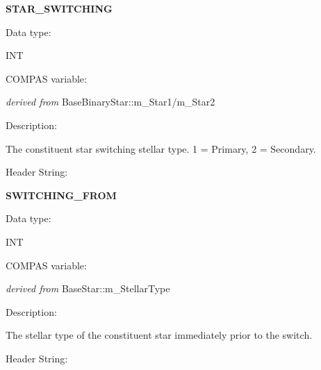 \medskip
\begin{minipage}{\textwidth} %
    \textbf{STAR\_SWITCHING} \\
    \parskip 0pt
    \begin{minipage}[t][][b]{8.25em}Data type:\end{minipage}
    \begin{minipage}[t][][b]{\dimexpr\textwidth-8.75em}INT\end{minipage}\vfill
    \begin{minipage}[t][][b]{8.25em}COMPAS variable:\end{minipage}
    \begin{minipage}[t][][b]{\dimexpr\textwidth-8.75em}\textit{derived from }BaseBinaryStar::m\_Star1/m\_Star2\end{minipage}\vfill
    \begin{minipage}[t][][b]{8.25em}Description:\end{minipage}
    \begin{minipage}[t][][b]{\dimexpr\textwidth-8.75em}\raggedright{The constituent star switching stellar type. 1 = Primary, 2 = Secondary.}\end{minipage}\vfill
    \begin{minipage}[t][][b]{8.25em}Header String:\end{minipage}
    \begin{minipage}[t][][b]{\dimexpr\textwidth-8.75em}\raggedright{}\end{minipage}\vfill
\end{minipage}

\medskip
\begin{minipage}{\textwidth} %
    \textbf{SWITCHING\_FROM} \\
    \parskip 0pt
    \begin{minipage}[t][][b]{8.25em}Data type:\end{minipage}
    \begin{minipage}[t][][b]{\dimexpr\textwidth-8.75em}INT\end{minipage}\vfill
    \begin{minipage}[t][][b]{8.25em}COMPAS variable:\end{minipage}
    \begin{minipage}[t][][b]{\dimexpr\textwidth-8.75em}\textit{derived from }BaseStar::m\_StellarType\end{minipage}\vfill
    \begin{minipage}[t][][b]{8.25em}Description:\end{minipage}
    \begin{minipage}[t][][b]{\dimexpr\textwidth-8.75em}\raggedright{The stellar type of the constituent star immediately prior to the switch.}\end{minipage}\vfill
    \begin{minipage}[t][][b]{8.25em}Header String:\end{minipage}
    \begin{minipage}[t][][b]{\dimexpr\textwidth-8.75em}\raggedright{}\end{minipage}\vfill
\end{minipage}


